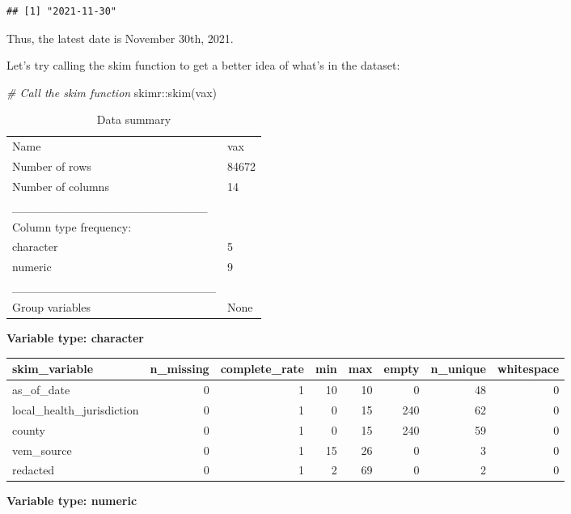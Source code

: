 \documentclass[
]{article}
\newenvironment{Shaded}{\begin{snugshade}}{\end{snugshade}}
\newcommand{\CommentTok}[1]{\textcolor[rgb]{0.56,0.35,0.01}{\textit{#1}}}
\newcommand{\FunctionTok}[1]{\textcolor[rgb]{0.00,0.00,0.00}{#1}}
\newcommand{\NormalTok}[1]{#1}
\newcommand{\SpecialCharTok}[1]{\textcolor[rgb]{0.00,0.00,0.00}{#1}}
\begin{document}
\begin{verbatim}
## [1] "2021-11-30"
\end{verbatim}

Thus, the latest date is November 30th, 2021.

Let's try calling the skim function to get a better idea of what's in
the dataset:

\begin{Shaded}
\begin{Highlighting}[]
\CommentTok{\# Call the skim function}
\NormalTok{skimr}\SpecialCharTok{::}\FunctionTok{skim}\NormalTok{(vax)}
\end{Highlighting}
\end{Shaded}

\begin{longtable}[]{@{}ll@{}}
\caption{Data summary}\tabularnewline
\toprule
\endhead
Name & vax \\
Number of rows & 84672 \\
Number of columns & 14 \\
\_\_\_\_\_\_\_\_\_\_\_\_\_\_\_\_\_\_\_\_\_\_\_ & \\
Column type frequency: & \\
character & 5 \\
numeric & 9 \\
\_\_\_\_\_\_\_\_\_\_\_\_\_\_\_\_\_\_\_\_\_\_\_\_ & \\
Group variables & None \\
\bottomrule
\end{longtable}

\textbf{Variable type: character}

\begin{longtable}[]{@{}lrrrrrrr@{}}
\toprule
skim\_variable & n\_missing & complete\_rate & min & max & empty &
n\_unique & whitespace \\
\midrule
\endhead
as\_of\_date & 0 & 1 & 10 & 10 & 0 & 48 & 0 \\
local\_health\_jurisdiction & 0 & 1 & 0 & 15 & 240 & 62 & 0 \\
county & 0 & 1 & 0 & 15 & 240 & 59 & 0 \\
vem\_source & 0 & 1 & 15 & 26 & 0 & 3 & 0 \\
redacted & 0 & 1 & 2 & 69 & 0 & 2 & 0 \\
\bottomrule
\end{longtable}

\textbf{Variable type: numeric}
\end{document}
